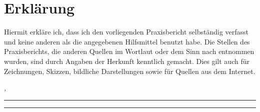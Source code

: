 %
\chapter*{Erklärung}
\label{sec:declaration}
\thispagestyle{empty}

Hiermit erkläre ich, dass ich den vorliegenden Praxisbericht selbständig verfasst und keine anderen als die angegebenen Hilfsmittel benutzt habe.
Die Stellen des Praxisberichts, die anderen Quellen im Wortlaut oder dem Sinn nach entnommen wurden, sind durch Angaben der Herkunft kenntlich gemacht.
Dies gilt auch für Zeichnungen, Skizzen, bildliche Darstellungen sowie für Quellen aus dem Internet.

\bigskip

\noindent\textit{\thesisUniversityCity, \thesisDate}

\smallskip

\begin{flushright}
	\begin{minipage}{5cm}
		\rule{\textwidth}{1pt}
		\centering\thesisName
	\end{minipage}
\end{flushright}

\medskip

\begin{flushright}
	\begin{minipage}{5cm}
		\rule{\textwidth}{1pt}
		\centering\thesisSecondReviewer
	\end{minipage}
\end{flushright}

